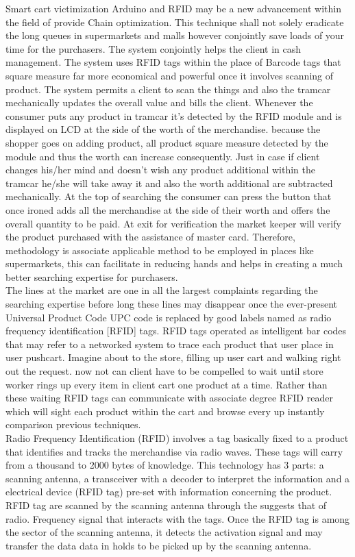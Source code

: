 \documentclass[12pt]{article}
\begin{document}
\hspace*{1cm}Smart cart victimization Arduino and RFID may be a new advancement within the field of provide Chain optimization. This technique shall not solely eradicate the long queues in supermarkets and malls however conjointly save loads of your time for the purchasers. The system conjointly helps the client in cash management. The system uses RFID tags within the place of Barcode tags that square measure far more economical and powerful once it involves scanning of product. The system permits a client to scan the things and also the tramcar mechanically updates the overall value and bills the client. Whenever the consumer puts any product in tramcar it's detected by the RFID module and is displayed on LCD at the side of the worth of the merchandise. because the shopper goes on adding product, all product square measure detected by the module and thus the worth can increase consequently. Just in case if client changes his/her mind and doesn't wish any product additional within the tramcar he/she will take away it and also the worth additional are subtracted mechanically. At the top of searching the consumer can press the button that once ironed adds all the merchandise at the side of their worth and offers the overall quantity to be paid. At exit for verification the market keeper will verify the product purchased with the assistance of master card. Therefore, methodology is associate applicable method to be employed in places like supermarkets, this can facilitate in reducing hands and helps in creating a much better searching expertise for purchasers.\\
\hspace*{1cm}The lines at the market are one in all the largest complaints regarding the searching expertise before long these lines may disappear once the ever-present Universal Product Code UPC code is replaced by good labels named as radio frequency identification [RFID] tags. RFID tags operated as intelligent bar codes that may refer to a networked system to trace each product that user place in user pushcart. Imagine about to the store, filling up user cart and walking right out the request. now not can client have to be compelled to wait until store worker rings up every item in client cart one product at a time. Rather than these waiting RFID tags can communicate with associate degree RFID reader which will sight each product within the cart and browse every up instantly comparison previous techniques.\\
\hspace*{1cm}Radio Frequency Identification (RFID) involves a tag basically fixed to a product that identifies and tracks the merchandise via radio waves. These tags will carry from a thousand to 2000 bytes of knowledge. This technology has 3 parts: a scanning antenna, a transceiver with a decoder to interpret the information and a electrical device (RFID tag) pre-set with information concerning the product. RFID tag are scanned by the scanning antenna through the suggests that of radio. Frequency signal that interacts with the tags. Once the RFID tag is among the sector of the scanning antenna, it detects the activation signal and may transfer the {data} data in holds to be picked up by the scanning antenna.\\
\end{document}
